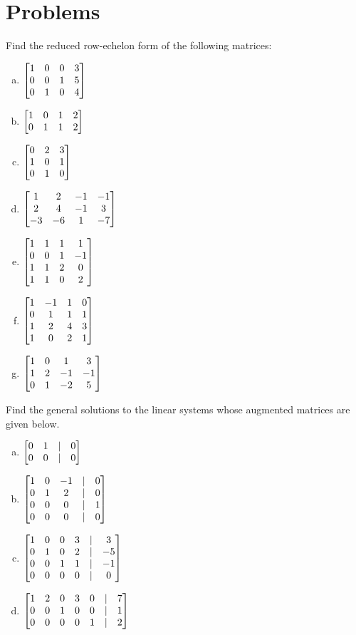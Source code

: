 \section*{Problems}




 \begin{prob} \label{prob12.1} Find the reduced row-echelon form of the following matrices:
\medskip
\begin{enumerate}[a)]
\item $\bmatrix 1&0&0&3\cr 0&0&1&5\cr 0&1&0&4 \endbmatrix $
\medskip 
%
\item\sov 
$\bmatrix 1&0&1&2\cr 0&1&1&2\endbmatrix $ 
\medskip
%
\item $\bmatrix 0&2&3\\1&0&1\\ 0&1&0 \endbmatrix $
\medskip
%
\item\sov $\bmatrix 1&2&-1&-1\\2&4&-1&3\\ -3&-6&1&-7\endbmatrix$
\medskip
%
\item $\bmatrix 1& 1& 1& 1\\ 0& 0& 1& -1\\ 1& 1& 2& 0\\ 1& 1& 0& 2 \endbmatrix$ \medskip
%
\item\sov $\bmatrix 1 & -1 & 1 & 0 \\
 0 & 1 & 1 & 1 \\
 1 & 2 & 4 & 3 \\
 1 & 0 & 2 & 1\endbmatrix$\medskip
%
\item $\bmatrix 1&0&1&3\\ 1&2&-1&-1\\ 0&1&-2&5\endbmatrix $\medskip
%
\end{enumerate}

\end{prob} \begin{prob} \label{prob12.2} Find the general solutions to the linear systems whose augmented matrices are given below.
\medskip
\begin{enumerate}[a)]

\item $\bmatrix  0 & 1 &|& 0 \\
 0 & 0 &|& 0 \endbmatrix$
\medskip
% 
\item\sov $ \bmatrix 1 & 0 & -1 &|&0 \\
 0 & 1 & 2 &|&0\\
 0 & 0 & 0&|&1 \\
 0 & 0 & 0 &|&0\endbmatrix$
\medskip
%
\item $\bmatrix  1 & 0 & 0 & 3 &|& 3 \\
 0 & 1 & 0 & 2 &|& -5 \\
 0 & 0 & 1 & 1 &|& -1 \\
 0 & 0 & 0 & 0 &|& 0\endbmatrix$
\medskip
%
\item\sov $\bmatrix  1 & 2 & 0 & 3 & 0 &|& 7 \\
 0 & 0 & 1 & 0 & 0 &|& 1 \\
 0 & 0 & 0 & 0 & 1 &|& 2 \endbmatrix$
\medskip
%


\end{enumerate}
\end{prob}
